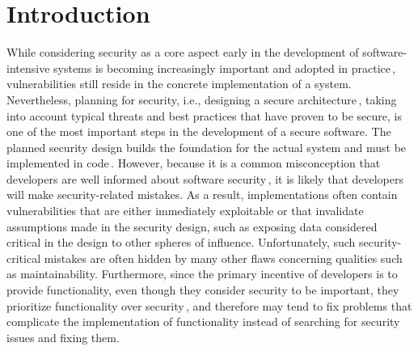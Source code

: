 \section{Introduction}
\label{sec:intro}
\noindent
While considering security as a core aspect early in the development of software-intensive systems is becoming increasingly important and adopted in practice\,\cite{10.1145/3468264.3473926,Peldszus2025}, vulnerabilities still reside in the concrete implementation of a system.
Nevertheless, planning for security, i.e., designing a secure architecture\,\cite{1281254}, taking into account typical threats and best practices that have proven to be secure, is one of the most important steps in the development of a secure software.
The planned security design builds the foundation for the actual system and must be implemented in code\,\cite{1281254,10.1145/3385678.3385687}.
However, because it is a common misconception that developers are well informed about software security\,\cite{Ryan2023}, it is likely that developers will make security-related mistakes. As a result, implementations often contain vulnerabilities that are either immediately exploitable or that invalidate assumptions made in the security design, such as exposing data considered critical in the design to other spheres of influence.
Unfortunately, such security-critical mistakes are often hidden by many other flaws concerning qualities such as maintainability.
Furthermore, since the primary incentive of developers is to provide functionality, even though they consider security to be important, they prioritize functionality over security\,\cite{Peldszus2025}, and therefore may tend to fix problems that complicate the implementation of functionality instead of searching for security issues and fixing them.

